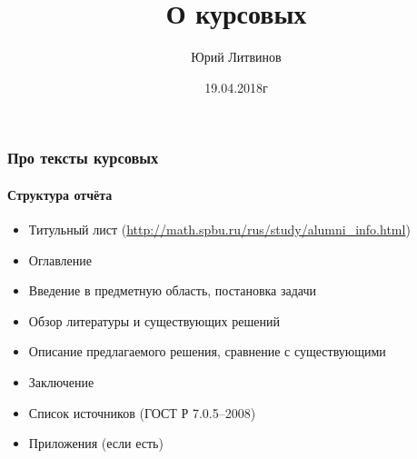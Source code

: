 \documentclass[xetex,mathserif,serif]{beamer}
\title{О курсовых}
\author{Юрий Литвинов}
\date{19.04.2018г}
\begin{document}
	\frame{\titlepage}

	\begin{frame}
		\frametitle{Про тексты курсовых}
		\framesubtitle{Структура отчёта}
		\begin{itemize}
			\item Титульный лист (\url{http://math.spbu.ru/rus/study/alumni\_info.html})
			\item Оглавление
			\item Введение в предметную область, постановка задачи
			\item Обзор литературы и существующих решений
			\item Описание предлагаемого решения, сравнение с существующими
			\item Заключение
			\item Список источников (ГОСТ Р 7.0.5--2008)
			\item Приложения (если есть)
		\end{itemize}
	\end{frame}
\end{document}
